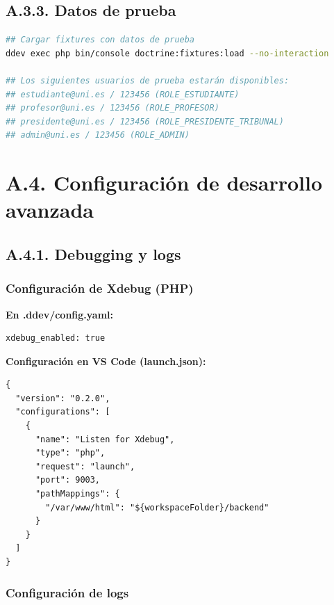\documentclass[12pt,a4paper,oneside]{report}
\begin{document}
\subsection{A.3.3. Datos de prueba}\label{a.3.3.-datos-de-prueba}

\begin{lstlisting}[language=bash]
## Cargar fixtures con datos de prueba
ddev exec php bin/console doctrine:fixtures:load --no-interaction

## Los siguientes usuarios de prueba estarán disponibles:
## estudiante@uni.es / 123456 (ROLE_ESTUDIANTE)
## profesor@uni.es / 123456 (ROLE_PROFESOR)
## presidente@uni.es / 123456 (ROLE_PRESIDENTE_TRIBUNAL)
## admin@uni.es / 123456 (ROLE_ADMIN)
\end{lstlisting}

\section{A.4. Configuración de desarrollo
avanzada}\label{a.4.-configuraciuxf3n-de-desarrollo-avanzada}

\subsection{A.4.1. Debugging y logs}\label{a.4.1.-debugging-y-logs}

\subsubsection{Configuración de Xdebug
(PHP)}\label{configuraciuxf3n-de-xdebug-php}

\textbf{En .ddev/config.yaml:}

\begin{lstlisting}
xdebug_enabled: true
\end{lstlisting}

\textbf{Configuración en VS Code (launch.json):}

\begin{lstlisting}
{
  "version": "0.2.0",
  "configurations": [
    {
      "name": "Listen for Xdebug",
      "type": "php",
      "request": "launch",
      "port": 9003,
      "pathMappings": {
        "/var/www/html": "${workspaceFolder}/backend"
      }
    }
  ]
}
\end{lstlisting}

\subsubsection{Configuración de logs}\label{configuraciuxf3n-de-logs}
\end{document}
